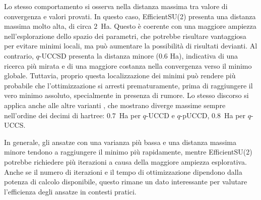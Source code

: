 Lo stesso comportamento si osserva nella distanza massima tra valore di convergenza e valori provati. In questo caso, EfficientSU(2) presenta una distanza massima molto alta, di circa $2$~Ha. Questo è coerente con una maggiore ampiezza nell’esplorazione dello spazio dei parametri, che potrebbe risultare vantaggiosa per evitare minimi locali, ma può aumentare la possibilità di risultati devianti. Al contrario, $q$-UCCSD presenta la distanza minore (0.6 Ha), indicativa di una ricerca più mirata e di una maggiore costanza nella convergenza verso il minimo globale. Tuttavia, proprio questa localizzazione dei minimi può rendere più probabile che l’ottimizzazione si arresti prematuramente, prima di raggiungere il vero minimo assoluto, specialmente in presenza di rumore. Lo stesso discorso si applica anche alle altre varianti , che mostrano diverge massime sempre nell'ordine dei decimi di hartree: $0.7$~Ha per $q$-UCCD e $q$-pUCCD, $0.8$~Ha per $q$-UCCS.

In generale, gli ansatze con una varianza più bassa e una distanza massima minore tendono a raggiungere il minimo più rapidamente, mentre EfficientSU(2) potrebbe richiedere più iterazioni a causa della maggiore ampiezza esplorativa. Anche se il numero di iterazioni e il tempo di ottimizzazione dipendono dalla potenza di calcolo disponibile, questo rimane un dato interessante per valutare l’efficienza degli ansatze in contesti pratici.

